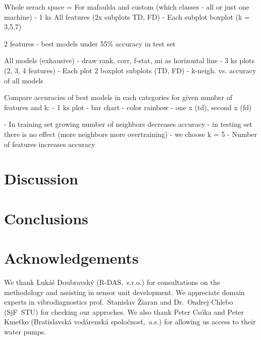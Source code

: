 \documentclass{llncs}
\begin{document}
Whole serach space = For mafaulda and custom (which classes - all or just one machine)
- 1 ks All features (2x subplots TD, FD)
	- Each subplot boxplot (k = 3,5,7)

2 features - best models under 55\% accuracy in test set

All models (exhausive) - draw rank, corr, f-stat, mi as horizontal line
	- 3 ks plots (2, 3, 4 features)
		- Each plot 2 boxplot subplots (TD, FD) - k-neigh. vs. accuracy of all models


Compare accuracies of best models in each categories for given number of features and k:
- 1 ks plot - bar chart - color rainbow - one x (td), second x (fd)



- In training set growing number of neighbors decreases accuracy - in testing set there is no effect (more neighbors more overtraining)
	- we choose k = 5
- Number of features increases accuracy






\section{Discussion}

\section{Conclusions}


\section*{Acknowledgements}
We thank Lukáš Doubravský (R-DAS,~s.r.o.) for consultations on the methodology and assisting in sensor unit development. We appreciate domain experts in vibrodiagnostics prof.~Stanislav Žiaran and Dr.~Ondrej Chlebo (SjF~STU) for checking our approches. We also thank Peter Csóka and Peter Kmeťko (Bratislavská vodárenská spoločnosť,~a.s.) for allowing us access to their water pumps.

\printbibliography
\end{document}
